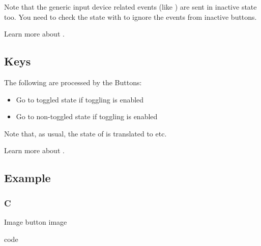\documentclass[letterpaper,10pt,english]{sphinxmanual}
\begin{document}
Note that the generic input device related events (like ) are sent in inactive state too. You need to check the state with  to ignore the events from inactive buttons.

Learn more about {\hyperref[\detokenize{overview/events::doc}]{}}.


\subsection{Keys}
\label{\detokenize{object-types/imgbtn:keys}}
The following  are processed by the Buttons:
\begin{itemize}
\item {} 
 Go to toggled state if toggling is enabled

\item {} 
 Go to non-toggled state if toggling is  enabled

\end{itemize}

Note that, as usual, the state of  is translated to  etc.

Learn more about {\hyperref[\detokenize{overview/indev::doc}]{}}.


\subsection{Example}
\label{\detokenize{object-types/imgbtn:example}}

\subsubsection{C}
\label{\detokenize{object-types/imgbtn:c}}
Image button image

code
\end{document}
